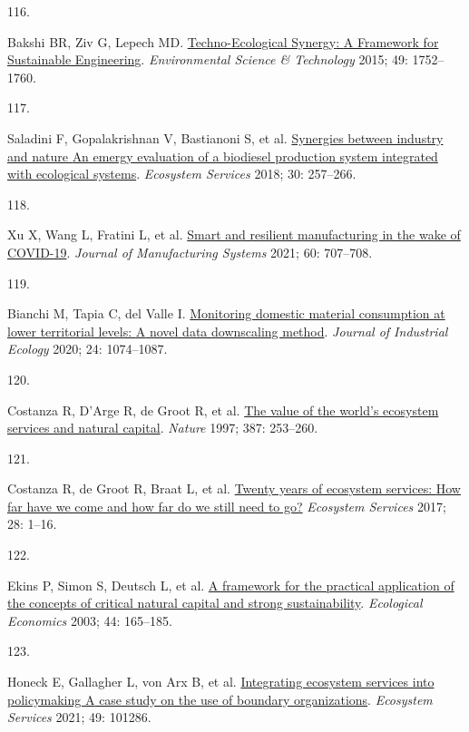 \documentclass[
  12pt,
  a4paperpaper,
  onecolumn]{article}
\newlength{\cslhangindent}
\newlength{\csllabelwidth}
\newlength{\cslentryspacingunit} %
\newenvironment{CSLReferences}[2] %
 {%
  \setlength{\parindent}{0pt}
  \ifodd #1
  \let\oldpar\par
  \def\par{\hangindent=\cslhangindent\oldpar}
  \fi
  \setlength{\parskip}{#2\cslentryspacingunit}
 }%
 {}
\newcommand{\CSLLeftMargin}[1]{\parbox[t]{\csllabelwidth}{#1}}
\newcommand{\CSLRightInline}[1]{\parbox[t]{\linewidth - \csllabelwidth}{#1}\break}
\begin{document}
\begin{CSLReferences}{0}{0}
\leavevmode{}%
\CSLLeftMargin{116. }%
\CSLRightInline{Bakshi BR, Ziv G, Lepech MD.
\href{https://doi.org/10.1021/es5041442}{Techno-{Ecological Synergy}: {A
Framework} for {Sustainable Engineering}}. \emph{Environmental Science
\& Technology} 2015; 49: 1752--1760.}

\leavevmode{}%
\CSLLeftMargin{117. }%
\CSLRightInline{Saladini F, Gopalakrishnan V, Bastianoni S, et al.
\href{https://doi.org/10.1016/j.ecoser.2018.02.004}{Synergies between
industry and nature \textendash{} {An} emergy evaluation of a biodiesel
production system integrated with ecological systems}. \emph{Ecosystem
Services} 2018; 30: 257--266.}

\leavevmode{}%
\CSLLeftMargin{118. }%
\CSLRightInline{Xu X, Wang L, Fratini L, et al.
\href{https://doi.org/10.1016/j.jmsy.2021.07.025}{Smart and resilient
manufacturing in the wake of {COVID-19}}. \emph{Journal of Manufacturing
Systems} 2021; 60: 707--708.}

\leavevmode{}%
\CSLLeftMargin{119. }%
\CSLRightInline{Bianchi M, Tapia C, del Valle I.
\href{https://doi.org/10.1111/jiec.13000}{Monitoring domestic material
consumption at lower territorial levels: {A} novel data downscaling
method}. \emph{Journal of Industrial Ecology} 2020; 24: 1074--1087.}

\leavevmode{}%
\CSLLeftMargin{120. }%
\CSLRightInline{Costanza R, D'Arge R, de Groot R, et al.
\href{https://doi.org/10.1038/387253a0}{The value of the world's
ecosystem services and natural capital}. \emph{Nature} 1997; 387:
253--260.}

\leavevmode{}%
\CSLLeftMargin{121. }%
\CSLRightInline{Costanza R, de Groot R, Braat L, et al.
\href{https://doi.org/10.1016/j.ecoser.2017.09.008}{Twenty years of
ecosystem services: {How} far have we come and how far do we still need
to go?} \emph{Ecosystem Services} 2017; 28: 1--16.}

\leavevmode{}%
\CSLLeftMargin{122. }%
\CSLRightInline{Ekins P, Simon S, Deutsch L, et al.
\href{https://doi.org/10.1016/S0921-8009(02)00272-0}{A framework for the
practical application of the concepts of critical natural capital and
strong sustainability}. \emph{Ecological Economics} 2003; 44: 165--185.}

\leavevmode{}%
\CSLLeftMargin{123. }%
\CSLRightInline{Honeck E, Gallagher L, von Arx B, et al.
\href{https://doi.org/10.1016/j.ecoser.2021.101286}{Integrating
ecosystem services into policymaking \textendash{} {A} case study on the
use of boundary organizations}. \emph{Ecosystem Services} 2021; 49:
101286.}


\end{CSLReferences}
\end{document}
